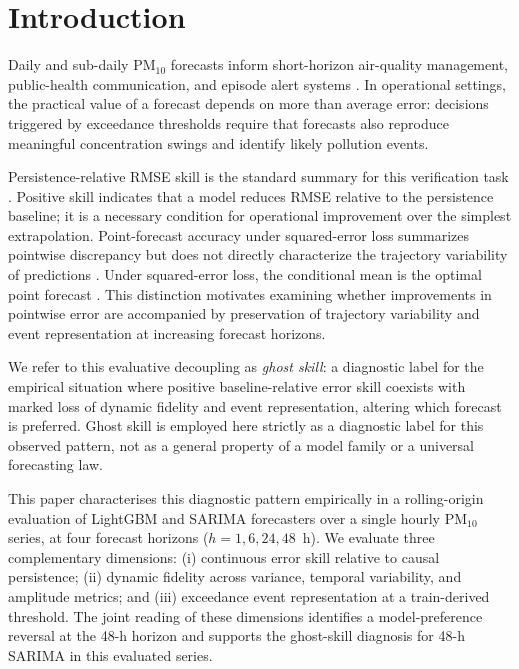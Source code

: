 \documentclass[12pt]{article}
\begin{document}
\section{Introduction}
\label{sec:introduction}

Daily and sub-daily PM$_{10}$ forecasts inform short-horizon
air-quality management, public-health communication, and episode
alert systems \citep{who2021,wilks2011}. In operational settings,
the practical value of a forecast depends on more than average error:
decisions triggered by exceedance thresholds require that forecasts
also reproduce meaningful concentration swings and identify likely
pollution events.

Persistence-relative RMSE skill is the standard summary for this
verification task \citep{hyndman2006}. Positive skill indicates that
a model reduces RMSE relative to the persistence baseline; it is a
necessary condition for operational improvement over the simplest
extrapolation. Point-forecast accuracy under squared-error loss summarizes pointwise
discrepancy but does not directly characterize the trajectory
variability of predictions \citep{gneiting2011,jolliffe2012}. Under
squared-error loss, the conditional mean is the optimal point forecast
\citep{gneiting2011}. This distinction motivates examining whether
improvements in pointwise error are accompanied by preservation of
trajectory variability and event representation at increasing forecast
horizons.

We refer to this evaluative decoupling as \emph{ghost skill}: a diagnostic
label for the empirical situation where positive baseline-relative error
skill coexists with marked loss of dynamic fidelity and event representation,
altering which forecast is preferred. Ghost skill is employed here strictly
as a diagnostic label for this observed pattern, not as a general property
of a model family or a universal forecasting law.

This paper characterises this diagnostic pattern empirically in a
rolling-origin evaluation of LightGBM and SARIMA forecasters over
a single hourly PM$_{10}$ series, at four forecast horizons
($h = 1, 6, 24, 48$~h). We evaluate three complementary dimensions:
(i) continuous error skill relative to causal persistence; (ii) dynamic
fidelity across variance, temporal variability, and amplitude metrics;
and (iii) exceedance event representation at a train-derived threshold.
The joint reading of these dimensions identifies a model-preference
reversal at the 48-h horizon and supports the ghost-skill diagnosis for
48-h SARIMA in this evaluated series.
\end{document}

